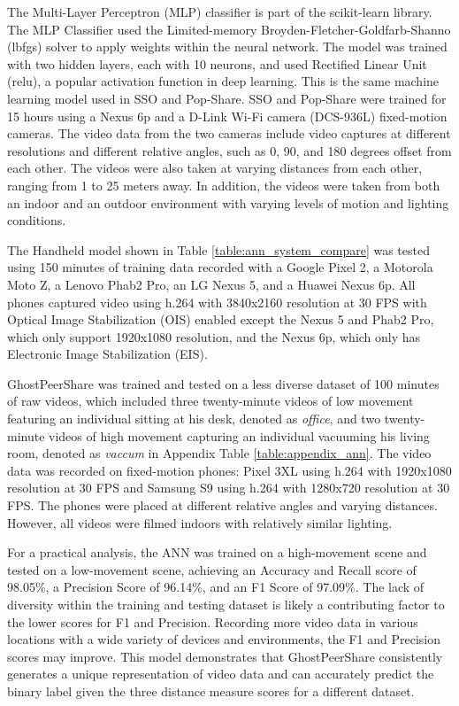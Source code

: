 The Multi-Layer Perceptron (MLP) classifier is part of the scikit-learn \cite{scikit-learn} library. The MLP Classifier used the Limited-memory Broyden-Fletcher-Goldfarb-Shanno (lbfgs) solver to apply weights within the neural network. The model was trained with two hidden layers, each with 10 neurons, and used Rectified Linear Unit (relu), a popular activation function in deep learning. This is the same machine learning model used in SSO and Pop-Share. SSO and Pop-Share were trained for 15 hours using a Nexus 6p and a D-Link Wi-Fi camera (DCS-936L) fixed-motion cameras. The video data from the two cameras include video captures at different resolutions and different relative angles, such as 0, 90, and 180 degrees offset from each other. The videos were also taken at varying distances from each other, ranging from 1 to 25 meters away. In addition, the videos were taken from both an indoor and an outdoor environment with varying levels of motion and lighting conditions.

The Handheld model shown in Table \ref{table:ann_system_compare} was tested using 150 minutes of training data recorded with a Google Pixel 2, a Motorola Moto Z, a Lenovo Phab2 Pro, an LG Nexus 5, and a Huawei Nexus 6p. All phones captured video using h.264 with 3840x2160 resolution at 30 FPS with Optical Image Stabilization (OIS) enabled except the Nexus 5 and Phab2 Pro, which only support 1920x1080 resolution, and the Nexus 6p, which only has Electronic Image Stabilization (EIS). 

GhostPeerShare was trained and tested on a less diverse dataset of 100 minutes of raw videos, which included three twenty-minute videos of low movement featuring an individual sitting at his desk, denoted as \textit{office}, and two twenty-minute videos of high movement capturing an individual vacuuming his living room, denoted as \textit{vaccum} in Appendix Table \ref{table:appendix_ann}. The video data was recorded on fixed-motion phones: Pixel 3XL using h.264 with 1920x1080 resolution at 30 FPS and Samsung S9 using h.264 with 1280x720 resolution at 30 FPS. The phones were placed at different relative angles and varying distances. However, all videos were filmed indoors with relatively similar lighting. 

For a practical analysis, the ANN was trained on a high-movement scene and tested on a low-movement scene, achieving an Accuracy and Recall score of 98.05\%, a Precision Score of 96.14\%, and an F1 Score of 97.09\%. The lack of diversity within the training and testing dataset is likely a contributing factor to the lower scores for F1 and Precision. Recording more video data in various locations with a wide variety of devices and environments, the F1 and Precision scores may improve. This model demonstrates that GhostPeerShare consistently generates a unique representation of video data and can accurately predict the binary label given the three distance measure scores for a different dataset.
